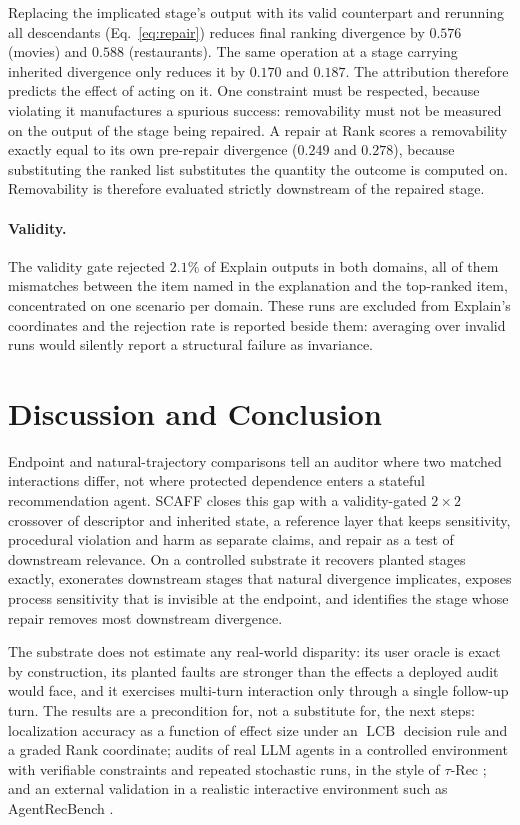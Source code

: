\documentclass[runningheads]{llncs}
\begin{document}
Replacing the implicated stage's output with its valid counterpart and rerunning all descendants
(Eq.~\eqref{eq:repair}) reduces final ranking divergence by $0.576$ (movies) and $0.588$
(restaurants). The same operation at a stage carrying inherited divergence only reduces it by
$0.170$ and $0.187$. The attribution therefore predicts the effect of acting on it. One
constraint must be respected, because violating it manufactures a spurious success:
removability must not be measured on the output of the stage being repaired. A repair at Rank
scores a removability exactly equal to its own pre-repair divergence ($0.249$ and $0.278$),
because substituting the ranked list substitutes the quantity the outcome is computed on.
Removability is therefore evaluated strictly downstream of the repaired stage.

\paragraph{Validity.}
The validity gate rejected $2.1\%$ of Explain outputs in both domains, all of them mismatches
between the item named in the explanation and the top-ranked item, concentrated on one scenario
per domain. These runs are excluded from Explain's coordinates and the rejection rate is
reported beside them: averaging over invalid runs would silently report a structural failure as
invariance.

\section{Discussion and Conclusion}
\label{sec:conclusion}

Endpoint and natural-trajectory comparisons tell an auditor where two matched interactions
differ, not where protected dependence enters a stateful recommendation agent. SCAFF closes this
gap with a validity-gated $2\times2$ crossover of descriptor and inherited state, a reference
layer that keeps sensitivity, procedural violation and harm as separate claims, and repair as a
test of downstream relevance. On a controlled substrate it recovers planted stages exactly,
exonerates downstream stages that natural divergence implicates, exposes process sensitivity
that is invisible at the endpoint, and identifies the stage whose repair removes most downstream
divergence.

The substrate does not estimate any real-world disparity: its user oracle is exact by
construction, its planted faults are stronger than the effects a deployed audit would face, and
it exercises multi-turn interaction only through a single follow-up turn. The results are a
precondition for, not a substitute for, the next steps: localization accuracy as a function of
effect size under an $\operatorname{LCB}$ decision rule and a graded Rank coordinate; audits of
real LLM agents in a controlled environment with verifiable constraints and repeated stochastic
runs, in the style of $\tau$-Rec \cite{narasimhan2026taurec}; and an external validation in a
realistic interactive environment such as AgentRecBench \cite{shang2025agentrecbench}.

%
%


\end{document}
